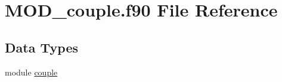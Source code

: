 \hypertarget{MOD__couple_8f90}{\section{M\-O\-D\-\_\-couple.\-f90 File Reference}
\label{MOD__couple_8f90}
}
\subsection*{Data Types}
\begin{DoxyCompactItemize}
\item 
module \hyperlink{classcouple}{couple}
\end{DoxyCompactItemize}
